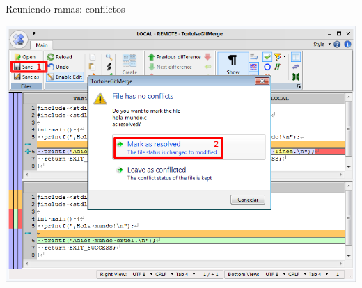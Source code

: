 \documentclass[xcolor=svgnames]{beamer}
\begin{document}
\begin{frame}{Reuniendo ramas: conflictos}
\begin{overlayarea}{\textwidth}{.65\textheight}
{\begin{center}
        \includegraphics[width=\textwidth,height=.6\textheight,keepaspectratio]{tomas/merge-conflict-tortoisegitm-noconflicts}
      \end{center}
    }
  \end{overlayarea}


\end{frame}
\end{document}
